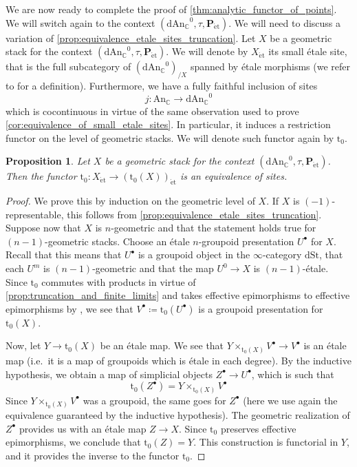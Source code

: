 \documentclass[12pt,a4paper,reqno]{amsart}
\theoremstyle{plain}
\newtheorem{prop}[thm]{Proposition}
\theoremstyle{definition}
\theoremstyle{remark}
\numberwithin{equation}{section}
\begin{document}
We are now ready to complete the proof of \cref{thm:analytic_functor_of_points}.
We will switch again to the context $({\mathrm{dAn}_{\mathbb C}}^0, \tau, \mathbf P_{\mathrm{\acute{e}t}})$.
We will need to discuss a variation of \cref{prop:equivalence_etale_sites_truncation}.
Let $X$ be a geometric stack for the context $({\mathrm{dAn}_{\mathbb C}}^0, \tau, \mathbf P_{\mathrm{\acute{e}t}})$.
We will denote by $X_{\mathrm{\acute{e}t}}$ its small \'etale site, that is the full subcategory of $({\mathrm{dAn}_{\mathbb C}}^0)_{/X}$ spanned by \'etale morphisms (we refer to \cite[Remark 2.17]{Porta_Yu_Higher_analytic_stacks_2014} for a definition).
Furthermore, we have a fully faithful inclusion of sites
\[ j \colon {\mathrm{An}_{{\mathbb C}}} \to {\mathrm{dAn}_{\mathbb C}}^0 \]
which is cocontinuous in virtue of the same observation used to prove \cref{cor:equivalence_of_small_etale_sites}.
In particular, it induces a restriction functor on the level of geometric stacks.
We will denote such functor again by ${\mathrm{t}_0}$.

\begin{prop}
	Let $X$ be a geometric stack for the context $({\mathrm{dAn}_{\mathbb C}}^0, \tau, \mathbf P_{\mathrm{\acute{e}t}})$. Then the functor ${\mathrm{t}_0} \colon X_{\mathrm{\acute{e}t}} \to ({\mathrm{t}_0}(X))_{\mathrm{\acute{e}t}}$ is an equivalence of sites.
\end{prop}

\begin{proof}
	We prove this by induction on the geometric level of $X$.
	If $X$ is $(-1)$-representable, this follows from \cref{prop:equivalence_etale_sites_truncation}.
	Suppose now that $X$ is $n$-geometric and that the statement holds true for $(n-1)$-geometric stacks.
	Choose an \'etale $n$-groupoid presentation $U^\bullet$ for $X$.
	Recall that this means that $U^\bullet$ is a groupoid object in the $\infty$-category $\mathrm{dSt}$, that each $U^m$ is $(n-1)$-geometric and that the map $U^0 \to X$ is $(n-1)$-\'etale.
	Since ${\mathrm{t}_0}$ commutes with products in virtue of \cref{prop:truncation_and_finite_limits} and takes effective epimorphisms to effective epimorphisms by \cite[7.2.1.14]{HTT}, we see that $V^\bullet \coloneqq {\mathrm{t}_0}(U^\bullet)$ is a groupoid presentation for ${\mathrm{t}_0}(X)$.
	
	Now, let $Y \to {\mathrm{t}_0}(X)$ be an \'etale map. We see that $Y \times_{{\mathrm{t}_0}(X)} V^\bullet \to V^\bullet$ is an \'etale map (i.e.\ it is a map of groupoids which is \'etale in each degree). By the inductive hypothesis, we obtain a map of simplicial objects $Z^\bullet \to U^\bullet$, which is such that
	\[ {\mathrm{t}_0}(Z^\bullet) = Y \times_{{\mathrm{t}_0}(X)} V^\bullet \]
	Since $Y \times_{{\mathrm{t}_0}(X)} V^\bullet$ was a groupoid, the same goes for $Z^\bullet$ (here we use again the equivalence guaranteed by the inductive hypothesis).
	The geometric realization of $Z^\bullet$ provides us with an \'etale map $Z \to X$. Since ${\mathrm{t}_0}$ preserves effective epimorphisms, we conclude that ${\mathrm{t}_0}(Z) = Y$.
	This construction is functorial in $Y$, and it provides the inverse to the functor ${\mathrm{t}_0}$.
\end{proof}
\end{document}
